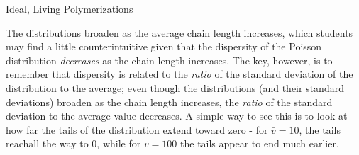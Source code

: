 \begin{activity}{Ideal, Living Polymerizations}
\begin{exercises}
\begin{solution}
{			The distributions broaden as the average chain length increases, which students may find a little counterintuitive given that the dispersity of the Poisson distribution \emph{decreases} as the chain length increases.  The key, however, is to remember that dispersity is related to the \emph{ratio} of the standard deviation of the distribution to the average; even though the distributions (and their standard deviations) broaden as the chain length increases, the \emph{ratio} of the standard deviation to the average value decreases.  A simple way to see this is to look at how far the tails of the distribution extend toward zero - for $\bar v = 10$, the tails reachall the way to 0, while for $\bar v = 100$ the tails appear to end much earlier.
		}\end{solution}
	
	
\end{exercises}




%
%	


	
\end{activity}